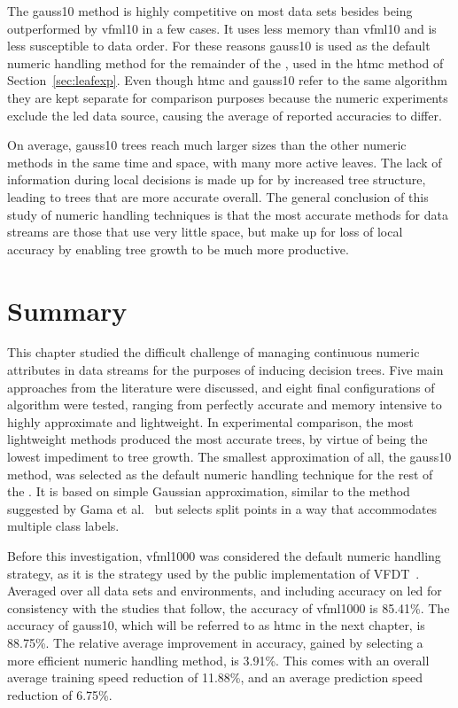 The {\sc gauss10} method is highly competitive on most data sets besides being outperformed by {\sc vfml10} in a few cases. It uses less memory than {\sc vfml10} and is less susceptible to data order.
For these reasons {\sc gauss10} is used as the default numeric handling method for the remainder of the \thesisc, used in the {\sc htmc} method of Section~\ref{sec:leafexp}. Even though {\sc htmc} and {\sc gauss10} refer to the same algorithm they are kept separate for comparison purposes because the numeric experiments exclude the {\sc led} data source, causing the average of reported accuracies to differ.

On average, {\sc gauss10} trees reach much larger sizes than the other numeric methods in the same time and space, with many more active leaves. The lack of information during local decisions is made up for by increased tree structure, leading to trees that are more accurate overall. The general conclusion of this study of numeric handling techniques is that the most accurate methods for data streams  are those that use very little space, but make up for loss of local accuracy by enabling tree growth to be much more productive. 

\section{Summary}

This chapter studied the difficult challenge of managing continuous numeric attributes in data streams for the purposes of inducing decision trees. Five main approaches from the literature were discussed, and eight final configurations of algorithm were tested, ranging from perfectly accurate and memory intensive to highly approximate and lightweight. In experimental comparison, the most lightweight methods produced the most accurate trees, by virtue of being the lowest impediment to tree growth. The smallest approximation of all, the {\sc gauss10} method, was selected as the default numeric handling technique for the rest of the \thesisc. It is based on simple Gaussian approximation, similar to the method suggested by Gama et al.~\cite{ufft} but selects split points in a way that accommodates multiple class labels.

Before this investigation, {\sc vfml1000} was considered the default
numeric handling strategy, as it is the strategy used by the public
implementation of VFDT~\cite{vfml}. Averaged over all data sets and
environments, and including accuracy on {\sc led} for consistency with the
studies that follow, the accuracy of {\sc vfml1000} is 85.41\%. The accuracy
of {\sc gauss10}, which will be referred to as {\sc htmc} in
the next chapter, is 88.75\%. The relative average improvement in accuracy,
gained by selecting a more efficient numeric handling method, is 3.91\%. This comes with an overall average training speed reduction of 11.88\%, and an average prediction speed reduction of 6.75\%.

